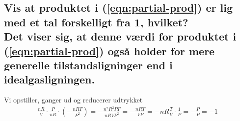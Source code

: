 \documentclass[11pt,a4paper]{article}
\begin{document}
\subsection
{
    \mdseries Vis at produktet i (\ref{eqn:partial-prod}) er lig med et tal
    forskelligt fra 1, hvilket?
    \\
    Det viser sig, at denne værdi for produktet i (\ref{eqn:partial-prod})
    også holder for mere generelle tilstandsligninger end i idealgasligningen.
}
Vi opstiller, ganger ud og reducerer udtrykket
\begin{align}
    \frac{n R}{V} \cdot \frac{P}{n R} \cdot \left( -\frac{n R T}{P^2} \right)
    = -\frac{n^2 R^2 P T}{n R V P^2}
    = -\frac{n R T}{V P}
    = -n R \frac{T}{V} \cdot \frac{1}{P}
    = - \frac{P}{P}
    = -1
\end{align}
\end{document}
